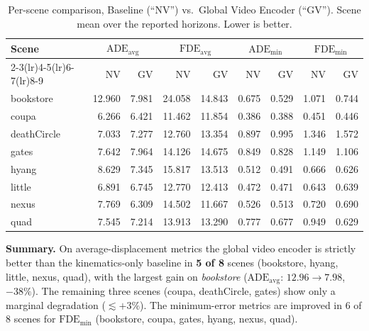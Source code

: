 \documentclass[11pt,a4paper]{article}
\begin{document}
\begin{table}[htpb]
    \centering
    \caption{Per-scene comparison, Baseline (``NV'') vs.\ Global Video Encoder
    (``GV''). Scene mean over the reported horizons. Lower is better.
    \label{tab:nv-vs-ve}}
    \small
    \setlength{\tabcolsep}{4pt}
    \begin{tabular}{l rr rr rr rr}
        \toprule
        Scene & \multicolumn{2}{c}{$\mathrm{ADE_{avg}}$}
              & \multicolumn{2}{c}{$\mathrm{FDE_{avg}}$}
              & \multicolumn{2}{c}{$\mathrm{ADE_{min}}$}
              & \multicolumn{2}{c}{$\mathrm{FDE_{min}}$} \\
        \cmidrule(lr){2-3}\cmidrule(lr){4-5}\cmidrule(lr){6-7}\cmidrule(lr){8-9}
              & NV    & GV    & NV    & GV    & NV    & GV    & NV    & GV \\
        \midrule
        bookstore  & 12.960 & 7.981 & 24.058 & 14.843 & 0.675 & 0.529 & 1.071 & 0.744 \\
        coupa      &  6.266 & 6.421 & 11.462 & 11.854 & 0.386 & 0.388 & 0.451 & 0.446 \\
        deathCircle&  7.033 & 7.277 & 12.760 & 13.354 & 0.897 & 0.995 & 1.346 & 1.572 \\
        gates      &  7.642 & 7.964 & 14.126 & 14.675 & 0.849 & 0.828 & 1.149 & 1.106 \\
        hyang      &  8.629 & 7.345 & 15.817 & 13.513 & 0.512 & 0.491 & 0.666 & 0.626 \\
        little     &  6.891 & 6.745 & 12.770 & 12.413 & 0.472 & 0.471 & 0.643 & 0.639 \\
        nexus      &  7.769 & 6.309 & 14.502 & 11.667 & 0.526 & 0.513 & 0.720 & 0.690 \\
        quad       &  7.545 & 7.214 & 13.913 & 13.290 & 0.777 & 0.677 & 0.949 & 0.629 \\
        \bottomrule
    \end{tabular}
\end{table}

\textbf{Summary.} On average-displacement metrics the global video encoder is
strictly better than the kinematics-only baseline in \textbf{5 of 8} scenes
(bookstore, hyang, little, nexus, quad), with the largest gain on \emph{bookstore}
($\mathrm{ADE_{avg}}$: $12.96 \to 7.98$, $-38\%$). The remaining three scenes
(coupa, deathCircle, gates) show only a marginal degradation ($\lesssim +3\%$).
The minimum-error metrics are improved in 6 of 8 scenes for $\mathrm{FDE_{min}}$
(bookstore, coupa, gates, hyang, nexus, quad).
\end{document}
